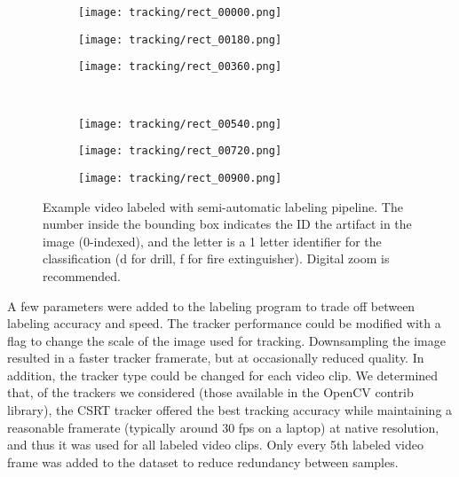\begin{figure}
	\centering
	\begin{subfigure}{0.3\textwidth}
		\texttt{[image: tracking/rect\_00000.png]}
	\end{subfigure}		
	\hfill
	\begin{subfigure}{0.3\textwidth}
		\texttt{[image: tracking/rect\_00180.png]}
	\end{subfigure}
	\hfill
	\begin{subfigure}{0.3\textwidth}
		\texttt{[image: tracking/rect\_00360.png]}
	\end{subfigure}
	\\
	\begin{subfigure}{0.3\textwidth}
		\texttt{[image: tracking/rect\_00540.png]}
	\end{subfigure}		
	\hfill
	\begin{subfigure}{0.3\textwidth}
		\texttt{[image: tracking/rect\_00720.png]}
	\end{subfigure}
	\hfill
	\begin{subfigure}{0.3\textwidth}
		\texttt{[image: tracking/rect\_00900.png]}
	\end{subfigure}	
	\caption[Example video labeled with semi-automatic pipeline]{Example video labeled with semi-automatic labeling pipeline. The number inside the bounding box indicates the ID the artifact in the image (0-indexed), and the letter is a 1 letter identifier for the classification (d for drill, f for fire extinguisher). Digital zoom is recommended.}
	\label{semi_automatic_labeling}
\end{figure}

A few parameters were added to the labeling program to trade off between labeling accuracy and speed. The tracker performance could be modified with a flag to change the scale of the image used for tracking. Downsampling the image resulted in a faster tracker framerate, but at occasionally reduced quality. In addition, the tracker type could be changed for each video clip. We determined that, of the trackers we considered (those available in the OpenCV contrib library), the CSRT tracker offered the best tracking accuracy while maintaining a reasonable framerate (typically around 30 fps on a laptop) at native resolution, and thus it was used for all labeled video clips. Only every 5th labeled video frame was added to the dataset to reduce redundancy between samples.

